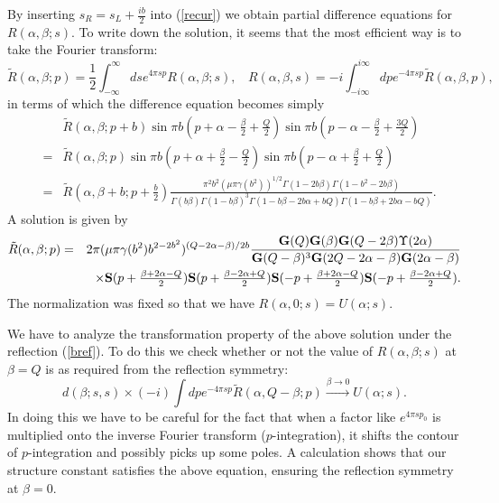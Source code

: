 \documentclass[a4paper,11pt]{article}
\newcommand{\tfrac}[2]{{\textstyle\frac{#1}{#2}}}
\newcommand{\bS}{{\bf S}}
\newcommand{\bG}{{\bf G}}
\begin{document}
    By inserting $s_R=s_L+\tfrac{ib}{2}$ into (\ref{recur})
 we obtain partial difference equations for $R(\alpha,\beta;s)$.
 To write down the solution, it seems that the most efficient way
 is to take the Fourier transform:
\begin{equation}
  \tilde{R}(\alpha,\beta;p)
  = \tfrac{1}{2}\int_{-\infty}^{\infty} ds e^{4\pi sp}R(\alpha,\beta;s),~~~~
  R(\alpha,\beta,s)
  = -i\int_{-i\infty}^{i\infty}dp e^{-4\pi sp}\tilde{R}(\alpha,\beta,p),
\end{equation}
 in terms of which the difference equation becomes simply
\begin{eqnarray}
&&
  \tilde{R}(\alpha,\beta;p+b)
       \sin\pi b(p+\alpha-\tfrac{\beta}{2}+\tfrac{Q}{2})
       \sin\pi b(p-\alpha-\tfrac{\beta}{2}+\tfrac{3Q}{2})
\nonumber \\ &=&
  \tilde{R}(\alpha,\beta;p)
       \sin\pi b(p+\alpha+\tfrac{\beta}{2}-\tfrac{Q}{2})
       \sin\pi b(p-\alpha+\tfrac{\beta}{2}+\tfrac{Q}{2})
\nonumber \\ &=&
  \tilde{R}(\alpha,\beta+b;p+\tfrac{b}{2})
  \frac{\pi^2 b^2(\mu\pi\gamma(b^2))^{1/2}
        \Gamma(1-2b\beta)\Gamma(1-b^2-2b\beta)}
       {\Gamma(b\beta)\Gamma(1-b\beta)^3
        \Gamma(1-b\beta-2b\alpha+bQ)\Gamma(1-b\beta+2b\alpha-bQ)}.
\end{eqnarray}
 A solution is given by
\begin{eqnarray}
  \tilde{R}(\alpha,\beta;p) &=&
  2\pi(\mu\pi\gamma(b^2)b^{2-2b^2})^{(Q-2\alpha-\beta)/2b}
  \frac{\bG(Q)\bG(\beta)\bG(Q-2\beta)\Upsilon(2\alpha)}
       {\bG(Q-\beta)^3\bG(2Q-2\alpha-\beta)\bG(2\alpha-\beta)}
  \nonumber \\ && \times 
  \bS( p+\tfrac{\beta+2\alpha-Q}{2})
  \bS( p+\tfrac{\beta-2\alpha+Q}{2})
  \bS(-p+\tfrac{\beta+2\alpha-Q}{2})
  \bS(-p+\tfrac{\beta-2\alpha+Q}{2}).
\label{Rtil}
\end{eqnarray}
 The normalization was fixed so that we have $R(\alpha,0;s)=U(\alpha;s)$.

   We have to analyze the transformation property of the above
 solution under the reflection (\ref{bref}).
 To do this we check whether or not the value of $R(\alpha,\beta;s)$
 at $\beta=Q$ is as required from the reflection symmetry:
\begin{equation}
  d(\beta;s,s)\times(-i)\int dp e^{-4\pi sp}\tilde{R}(\alpha,Q-\beta;p)
  \stackrel{\beta\to 0}{\rightarrow} U(\alpha;s).
\end{equation}
 In doing this we have to be careful for the fact that when a factor
 like $e^{4\pi sp_0}$ is multiplied onto the inverse Fourier transform
 ($p$-integration), it shifts the contour of $p$-integration
 and possibly picks up some poles.
 A calculation shows that our structure constant satisfies
 the above equation, ensuring the reflection symmetry at $\beta=0$.
\end{document}
